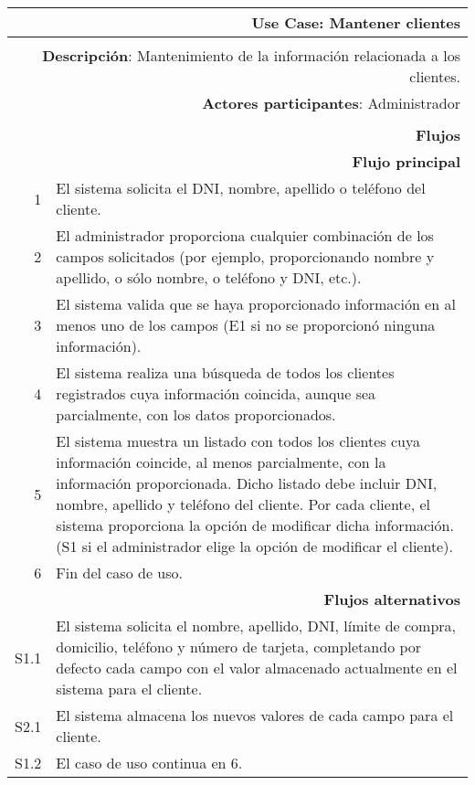 \begin{tabularx}{\textwidth}{| r | X |}
\hline
\multicolumn{2}{|X|}{
\textbf{Use Case}: Mantener clientes} \\

\hline
\multicolumn{2}{|c|}{\cellcolor[gray]{0.6}} \\

\hline
\multicolumn{2}{|X|}{
\textbf{Descripción}: Mantenimiento de la información relacionada a los
clientes.} \\

\hline
\multicolumn{2}{|X|}{
\textbf{Actores participantes}: Administrador} \\

\hline
\multicolumn{2}{|c|}{\cellcolor[gray]{0.6} } \\

\hline
\multicolumn{2}{|X|}{
\textbf{Flujos}} \\

\hline
\multicolumn{2}{|X|}{
\textbf{Flujo principal}} \\

\hline
1 & El sistema solicita el DNI, nombre, apellido o teléfono del cliente. \\
\hline
2 & El administrador proporciona cualquier combinación de los campos
solicitados (por ejemplo, proporcionando nombre y apellido, o sólo nombre, o
teléfono y DNI, etc.). \\
\hline
3 & El sistema valida que se haya proporcionado información en al menos uno de
los campos (E1 si no se proporcionó ninguna información). \\
\hline
4 & El sistema realiza una búsqueda de todos los clientes registrados cuya
información coincida, aunque sea parcialmente, con los datos proporcionados. \\
\hline
5 & El sistema muestra un listado con todos los clientes cuya información
coincide, al menos parcialmente, con la información proporcionada. Dicho
listado debe incluir DNI, nombre, apellido y teléfono del cliente. Por cada
cliente, el sistema proporciona la opción de modificar dicha información. (S1
si el administrador elige la opción de modificar el cliente). \\
\hline
6 & Fin del caso de uso. \\

\hline
\multicolumn{2}{|X|}{
\textbf{Flujos alternativos}} \\

\hline
S1.1 & El sistema solicita el nombre, apellido, DNI, límite de compra,
domicilio, teléfono y número de tarjeta, completando por defecto cada campo con
el valor almacenado actualmente en el sistema para el cliente. \\
\hline
S2.1 & El sistema almacena los nuevos valores de cada campo para el cliente. \\
\hline
S1.2 & El caso de uso continua en 6. \\

\hline
\end{tabularx}

